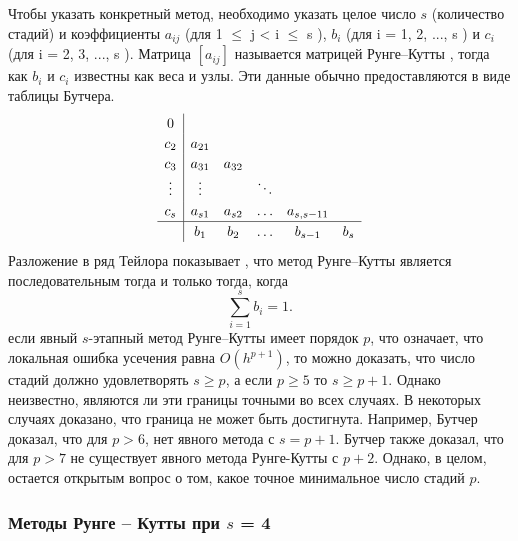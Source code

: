 \documentclass[a4paper,12pt]{article}
\begin{document}
	Чтобы указать конкретный метод, необходимо указать целое число \(s\) (количество стадий) и коэффициенты \(a_{ij}\) (для 1 \(\leq\) j < i \(\leq\) s ), \(b_i\) (для i = 1, 2, ..., s ) и \(c_i\) (для i = 2, 3, ..., s ). Матрица \([a_{ij}]\) называется матрицей Рунге–Кутты , тогда как \(b_i\) и \(c_i\) известны как веса и узлы. Эти данные обычно предоставляются в виде таблицы Бутчера.
	\[
	\renewcommand\arraystretch{1.2}
	\begin{array}
		{c|ccccc}
		0\\
		c_2 &a_{21}\\
		c_3 &a_{31} &a_{32}\\
		\vdots &\vdots & &\ddots\\
		c_s& a_{s1} &a_{s2}& \ldots&a_{s,s-11}\\
		\hline
		& b_1 &b_2 &\ldots &b_{s-1} &b_s
	\end{array}
	\]
	Разложение в ряд Тейлора показывает , что метод Рунге–Кутты является последовательным тогда и только тогда, когда
	\begin{equation}\label{eq:2} 
		\sum_{i=1}^{s}b_i=1.
	\end{equation}
	если явный \(s\)-этапный метод Рунге–Кутты имеет порядок \(p\), что означает, что локальная ошибка усечения равна \(O(h^{p+1})\), то можно доказать, что число стадий должно удовлетворять \(s\geq p\), а если \(p\geq 5\) то \(s\geq p+1\). Однако неизвестно, являются ли эти границы точными во всех случаях. В некоторых случаях доказано, что граница не может быть достигнута. Например, Бутчер доказал, что для \(p>6\), нет явного метода с \(s=p+1\). Бутчер также доказал, что для \(p>7\) не существует явного метода Рунге-Кутты с \(p+2\). Однако, в целом, остается открытым вопрос о том, какое точное минимальное число стадий \(p\).

	\subsubsection{Методы Рунге – Кутты при \(s\) = 4}
\end{document}
